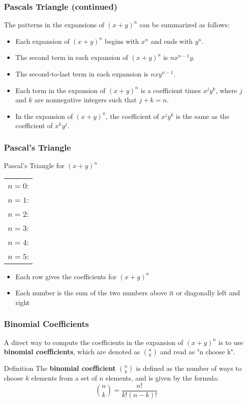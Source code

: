 \begin{frame}
\frametitle{Pascals Triangle (continued)} 
The patterns in the expansions of \((x + y)^n\) can be summarized as follows:
\begin{itemize}
    \item Each expansion of \((x + y)^n\) begins with \(x^n\) and ends with \(y^n\).
    \item The second term in each expansion of \((x + y)^n\) is \(n x^{n-1} y\).
    \item The second-to-last term in each expansion is \(n x y^{n-1}\).
    \item Each term in the expansion of \((x + y)^n\) is a coefficient times \(x^j y^k\), where \(j\) and \(k\) are nonnegative integers such that \(j + k = n\).
    \item In the expansion of \((x + y)^n\), the coefficient of \(x^j y^k\) is the same as the coefficient of \(x^k y^j\).
\end{itemize}
\end{frame}

\begin{frame}
\frametitle{Pascal's Triangle}
\begin{block}{Pascal's Triangle for $(x+y)^n$}
\centering
\begin{tabular}{c}
$n=0$: \quad 1 \\[0.5em]
$n=1$: \quad 1 \quad 1 \\[0.5em]
$n=2$: \quad 1 \quad 2 \quad 1 \\[0.5em]
$n=3$: \quad 1 \quad 3 \quad 3 \quad 1 \\[0.5em]
$n=4$: \quad 1 \quad 4 \quad 6 \quad 4 \quad 1 \\[0.5em]
$n=5$: \quad 1 \quad 5 \quad 10 \quad 10 \quad 5 \quad 1 \\[0.5em]
\end{tabular}
\end{block}
\begin{itemize}
    \item Each row gives the coefficients for $(x+y)^n$
    \item Each number is the sum of the two numbers above it or diagonally left and right
\end{itemize}
\end{frame}

\begin{frame}
\frametitle{Binomial Coefficients}
A direct way to compute the coefficients in the expansion of \((x + y)^n\) is to use \textbf{binomial coefficients}, which are denoted as \(\binom{n}{k}\) and read as "n choose k".
\begin{block}{Definition}
The \textbf{binomial coefficient} \(\binom{n}{k}\) is defined as the number of ways to choose \(k\) elements from a set of \(n\) elements, and is given by the formula:
\[
\binom{n}{k} = \frac{n!}{k!(n-k)!}
\]
\end{block}
\end{frame}

